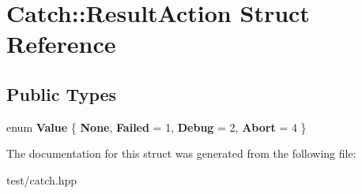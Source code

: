 \hypertarget{structCatch_1_1ResultAction}{}\section{Catch\+:\+:Result\+Action Struct Reference}
\label{structCatch_1_1ResultAction}
\subsection*{Public Types}
\begin{DoxyCompactItemize}
\item 
enum {\bfseries Value} \{ {\bfseries None}, 
{\bfseries Failed} = 1, 
{\bfseries Debug} = 2, 
{\bfseries Abort} = 4
 \}\hypertarget{structCatch_1_1ResultAction_a42d1644a0fbcedc17959b656ce68f88d}{}\label{structCatch_1_1ResultAction_a42d1644a0fbcedc17959b656ce68f88d}

\end{DoxyCompactItemize}


The documentation for this struct was generated from the following file\+:\begin{DoxyCompactItemize}
\item 
test/catch.\+hpp\end{DoxyCompactItemize}
